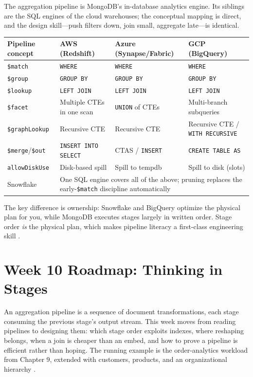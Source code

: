 \begin{crosscloud}
The aggregation pipeline is MongoDB's in-database analytics engine. Its siblings are the SQL engines of the cloud warehouses; the conceptual mapping is direct, and the design skill---push filters down, join small, aggregate late---is identical.

\vspace{2mm}
{\footnotesize
\begin{tabular}{@{}p{2.9cm}p{3.0cm}p{3.0cm}p{3.0cm}@{}} 
\toprule
\textbf{Pipeline concept} & \textbf{AWS (Redshift)} & \textbf{Azure (Synapse/Fabric)} & \textbf{GCP (BigQuery)} \\
\midrule
\texttt{\$match} & \texttt{WHERE} & \texttt{WHERE} & \texttt{WHERE} \\
\texttt{\$group} & \texttt{GROUP BY} & \texttt{GROUP BY} & \texttt{GROUP BY} \\
\texttt{\$lookup} & \texttt{LEFT JOIN} & \texttt{LEFT JOIN} & \texttt{LEFT JOIN} \\
\texttt{\$facet} & Multiple CTEs in one scan & \texttt{UNION} of CTEs & Multi-branch subqueries \\
\texttt{\$graphLookup} & Recursive CTE & Recursive CTE & Recursive CTE / \texttt{WITH RECURSIVE} \\
\texttt{\$merge}/\texttt{\$out} & \texttt{INSERT INTO SELECT} & CTAS / \texttt{INSERT} & \texttt{CREATE TABLE AS} \\
\texttt{allowDiskUse} & Disk-based spill & Spill to tempdb & Spill to disk (slots) \\
\addlinespace
Snowflake & \multicolumn{3}{l}{One SQL engine covers all of the above; pruning replaces the early-\texttt{\$match} discipline automatically} \\
\bottomrule
\end{tabular}}

\vspace{1mm}
The key difference is ownership: Snowflake and BigQuery optimize the physical plan for you, while MongoDB executes stages largely in written order. Stage order \emph{is} the physical plan, which makes pipeline literacy a first-class engineering skill \cite{mongodbAggregationDocs,snowflakeSemiStructuredDocs}.
\end{crosscloud}

\section{Week 10 Roadmap: Thinking in Stages}
An aggregation pipeline is a sequence of document transformations, each stage consuming the previous stage's output stream. This week moves from reading pipelines to designing them: which stage order exploits indexes, where reshaping belongs, when a join is cheaper than an embed, and how to prove a pipeline is efficient rather than hoping. The running example is the order-analytics workload from Chapter 9, extended with customers, products, and an organizational hierarchy \cite{mongodbAggregationDocs,mongodbLookupDocs}.

